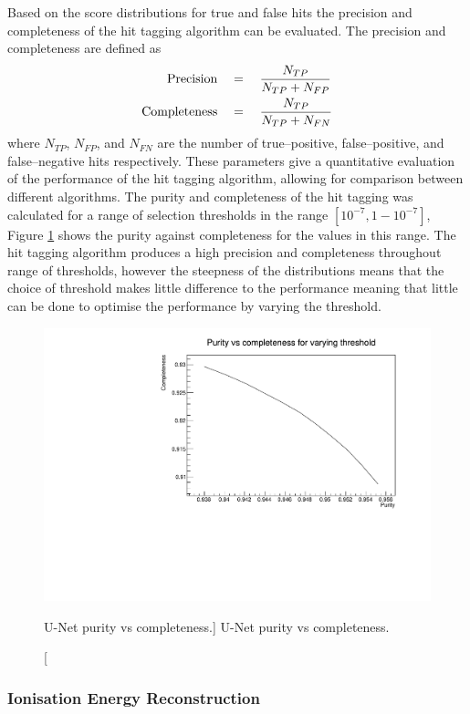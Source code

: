 Based on the score distributions for true and false hits the precision and
completeness of the hit tagging algorithm can be evaluated. The precision and
completeness are defined as 
\begin{align}
	\mbox{Precision} \quad &= \quad  \frac{N_{TP}}{N_{TP} + N_{FP}} \\
	\vspace{2mm}
	\mbox{Completeness} \quad &= \quad \frac{N_{TP}}{N_{TP} + N_{FN}}
\end{align}
where $N_{TP}$, $N_{FP}$, and $N_{FN}$ are the number of true--positive,
false--positive, and false--negative hits respectively. These parameters give a
quantitative evaluation of the performance of the hit tagging algorithm,
allowing for comparison between different algorithms. The purity and
completeness of the hit tagging was calculated for a range of selection
thresholds in the range $[10^{-7}, 1 - 10^{-7}]$, Figure \ref{fig:unet_pur_comp}
shows the purity against completeness for the values in this range. The hit
tagging algorithm produces a high precision and completeness throughout range of
thresholds, however the steepness of the distributions means that the choice of
threshold makes little difference to the performance meaning that little can be
done to optimise the performance by varying the threshold.
\begin{figure}
	\centering
	\includegraphics[width=\textwidth]{figures/unet_pur_v_comp.pdf}
	\caption
	[U-Net purity vs completeness.]
	{U-Net purity vs completeness.}
	\label{fig:unet_pur_comp}
\end{figure}

\subsubsection{Ionisation Energy Reconstruction}


